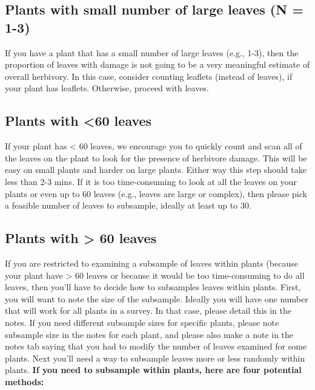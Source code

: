 \documentclass[
  letterpaper,
  oneside,
  open=any]{scrbook}
\begin{document}
\subsection{Plants with small number of large leaves (N =
1-3)}\label{plants-with-small-number-of-large-leaves-n-1-3}

If you have a plant that has a small number of large leaves (e.g., 1-3),
then the proportion of leaves with damage is not going to be a very
meaningful estimate of overall herbivory. In this case, consider
counting leaflets (instead of leaves), if your plant has leaflets.
Otherwise, proceed with leaves.

\subsection{Plants with \textless60 leaves}\label{plants-with-60-leaves}

If your plant has \textless{} 60 leaves, we encourage you to quickly
count and scan all of the leaves on the plant to look for the presence
of herbivore damage. This will be easy on small plants and harder on
large plants. Either way this step should take less than 2-3 mins. If it
is too time-consuming to look at all the leaves on your plants or even
up to 60 leaves (e.g., leaves are large or complex), then please pick a
feasible number of leaves to subsample, ideally at least up to 30.

\subsection{Plants with \textgreater{} 60
leaves}\label{plants-with-60-leaves-1}

If you are restricted to examining a subsample of leaves within plants
(because your plant have \textgreater{} 60 leaves or because it would be
too time-consuming to do all leaves, then you'll have to decide how to
subsamples leaves within plants. First, you will want to note the size
of the subsample. Ideally you will have one number that will work for
all plants in a survey. In that case, please detail this in the notes.
If you need different subsample sizes for specific plants, please note
subsample size in the notes for each plant, and please also make a note
in the notes tab saying that you had to modify the number of leaves
examined for some plants. Next you'll need a way to subsample leaves
more or less randomly within plants. \textbf{If you need to subsample
within plants, here are four potential methods:}
\end{document}
